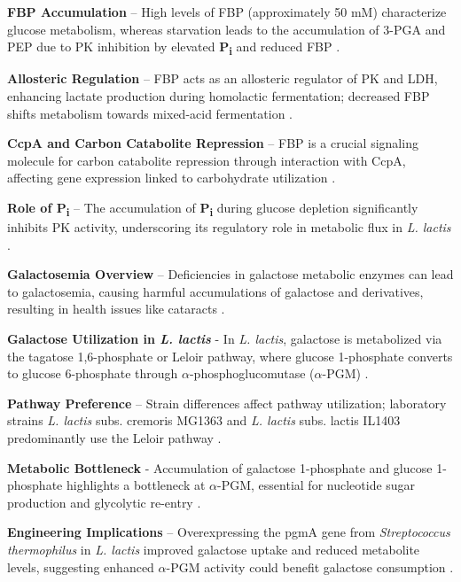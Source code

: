 \textbf{FBP Accumulation} – High levels of FBP (approximately 50 mM) characterize glucose metabolism, whereas starvation leads to the accumulation of 3-PGA and PEP due to PK inhibition by elevated \textbf{P\textsubscript{i}} and reduced FBP \cite*{L3-SugarMet}.

\textbf{Allosteric Regulation} – FBP acts as an allosteric regulator of PK and LDH, enhancing lactate production during homolactic fermentation; decreased FBP shifts metabolism towards mixed-acid fermentation \cite*{L3-SugarMet}.

\textbf{CcpA and Carbon Catabolite Repression} – FBP is a crucial signaling molecule for carbon catabolite repression through interaction with CcpA, affecting gene expression linked to carbohydrate utilization \cite*{L3-SugarMet}.

\textbf{Role of \textbf{P\textsubscript{i}}} – The accumulation of \textbf{P\textsubscript{i}} during glucose depletion significantly inhibits PK activity, underscoring its regulatory role in metabolic flux in \textit{L. lactis} \cite*{L3-SugarMet}.


\textbf{Galactosemia Overview} – Deficiencies in galactose metabolic enzymes can lead to galactosemia, causing harmful accumulations of galactose and derivatives, resulting in health issues like cataracts \cite*{L3-SugarMet}.

\textbf{Galactose Utilization in \textit{L. lactis}} - In \textit{L. lactis}, galactose is metabolized via the tagatose 1,6-phosphate or Leloir pathway, where glucose 1-phosphate converts to glucose 6-phosphate through $\alpha$-phosphoglucomutase ($\alpha$-PGM) \cite*{L3-SugarMet}.

\textbf{Pathway Preference} – Strain differences affect pathway utilization; laboratory strains \textit{L. lactis} subs. cremoris MG1363 and \textit{L. lactis} subs. lactis IL1403 predominantly use the Leloir pathway \cite*{L3-SugarMet}.

\textbf{Metabolic Bottleneck} - Accumulation of galactose 1-phosphate and glucose 1-phosphate highlights a bottleneck at $\alpha$-PGM, essential for nucleotide sugar production and glycolytic re-entry \cite*{L3-SugarMet}.

\textbf{Engineering Implications} – Overexpressing the pgmA gene from \textit{Streptococcus thermophilus} in \textit{L. lactis} improved galactose uptake and reduced metabolite levels, suggesting enhanced $\alpha$-PGM activity could benefit galactose consumption \cite*{L3-SugarMet}.

